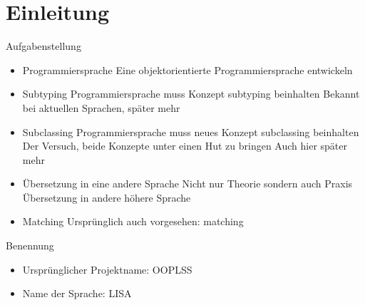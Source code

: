 \section{Einleitung}

\begin{frame}[t]{Aufgabenstellung}
		\begin{itemize}[<+->]
		\item Programmiersprache
		 {Eine objektorientierte Programmiersprache entwickeln}

		\item Subtyping
		 {Programmiersprache muss Konzept subtyping beinhalten}
		 {Bekannt bei aktuellen Sprachen, später mehr}

		\item Subclassing
		 {Programmiersprache muss neues Konzept subclassing beinhalten}
		 {Der Versuch, beide Konzepte unter einen Hut zu bringen}
		 {Auch hier später mehr}

		\item Übersetzung in eine andere Sprache
		 {Nicht nur Theorie sondern auch Praxis}
		 {Übersetzung in andere höhere Sprache}

		\item Matching
		 {Ursprünglich auch vorgesehen: matching}

		\end{itemize}
\end{frame}

\begin{frame}[t]{Benennung}
	\begin{itemize}[<+->]
		\item Ursprünglicher Projektname: OOPLSS

		\item Name der Sprache: LISA 

	\end{itemize}



\end{frame}

\begin{frame}[t]{}

\end{frame}
